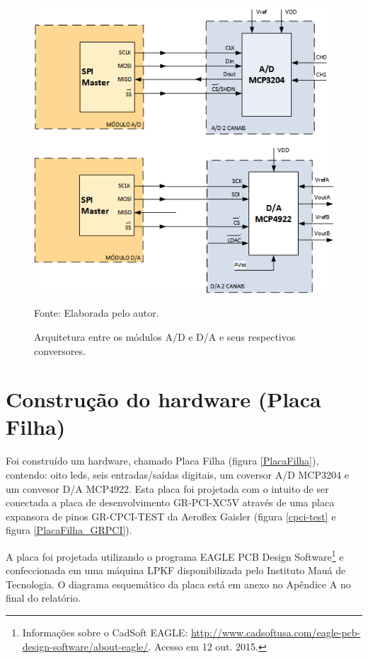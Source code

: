 \begin{figure}[!htb]
	\centering
	\caption{Arquitetura entre os módulos A/D e D/A e seus respectivos conversores.}
	\includegraphics[scale = 0.9]{Imagens/Arch_conversores}
	
	Fonte: Elaborada pelo autor.
	
	\label{Arch_conversores}
\end{figure}


\vfill

\section{Construção do hardware (Placa Filha)}

Foi construído um hardware, chamado Placa Filha (figura \ref{PlacaFilha}), contendo: oito leds, seis entradas/saídas digitais, um coversor A/D MCP3204 e um convesor D/A MCP4922. Esta placa foi projetada com o intuito de ser conectada a placa de desenvolvimento GR-PCI-XC5V através de uma placa expansora de pinos GR-CPCI-TEST da Aeroflex Gaisler (figura \ref{cpci-test} e figura \ref{PlacaFilha_GRPCI}).

A placa foi projetada utilizando o programa EAGLE PCB Design Software\footnote{Informações sobre o CadSoft EAGLE: \url{http://www.cadsoftusa.com/eagle-pcb-design-software/about-eagle/}. Acesso em 12 out. 2015.} e confeccionada em uma máquina LPKF disponibilizada pelo Instituto Mauá de Tecnologia. O diagrama esquemático da placa está em anexo no Apêndice A no final do relatório.

